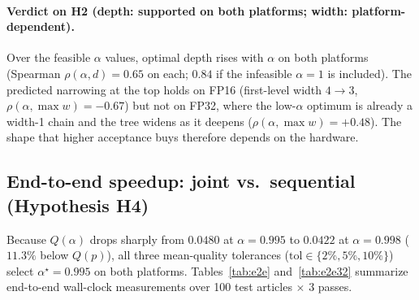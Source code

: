 \documentclass[10pt]{article}
\begin{document}
\paragraph{Verdict on H2 (depth: supported on both platforms; width: platform-dependent).} Over the feasible $\alpha$ values, optimal depth rises with $\alpha$ on both platforms (Spearman $\rho(\alpha, d) = 0.65$ on each; $0.84$ if the infeasible $\alpha = 1$ is included). The predicted narrowing at the top holds on FP16 (first-level width $4 \to 3$, $\rho(\alpha, \max w) = -0.67$) but not on FP32, where the low-$\alpha$ optimum is already a width-1 chain and the tree widens as it deepens ($\rho(\alpha, \max w) = +0.48$). The shape that higher acceptance buys therefore depends on the hardware.

\subsection{End-to-end speedup: joint vs.\ sequential (Hypothesis H4)}
Because $Q(\alpha)$ drops sharply from $0.0480$ at $\alpha = 0.995$ to $0.0422$ at $\alpha = 0.998$ ($11.3\%$ below $Q(p)$), all three mean-quality tolerances ($\mathrm{tol} \in \{2\%, 5\%, 10\%\}$) select $\alpha^\star = 0.995$ on both platforms. Tables~\ref{tab:e2e} and~\ref{tab:e2e32} summarize end-to-end wall-clock measurements over 100 test articles $\times$ 3 passes.
\end{document}
